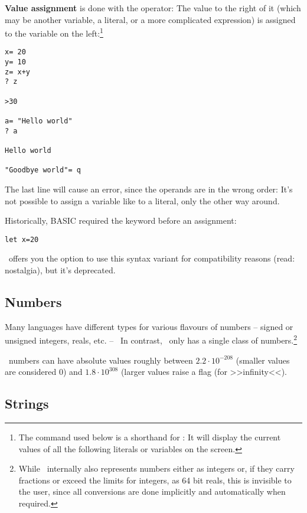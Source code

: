 \textbf{Value assignment} is done with the \Co{$=$} operator:  The value
to the right of it (which may be another variable, a literal, or a
more complicated expression) is assigned to the variable on the
left:\footnote{The command  used below is a shorthand for
: It will display the current values of all the following literals or
variables on the screen.}

\begin{lstlisting}
x= 20
y= 10
z= x+y
? z

>30

a= "Hello world"
? a

Hello world

"Goodbye world"= q
\end{lstlisting}

The last line will cause an error, since the operands are in the wrong
order: It's not possible to assign a variable like  to a literal,
only the other way around.

Historically, BASIC required the keyword  before an assignment:

\begin{lstlisting}
let x=20
\end{lstlisting}

\SB\ offers you the option to use this syntax variant for compatibility
reasons (read: nostalgia), but it's deprecated.

\subsection{Numbers}

Many languages have different types for various flavours of numbers --
signed or unsigned integers, reals, etc. --~ In contrast, \SB\ only has
a single class of numbers.\footnote{While \SB\ internally also
represents numbers either as integers or, if they carry fractions or
exceed the limits for integers, as 64 bit reals, this is invisible to
the user, since all conversions are done implicitly and automatically
when required.}

\SB\ numbers can have absolute values roughly between $2.2\cdot
10^{-208}$ (smaller values are considered $0$) and $1.8\cdot 10^{308}$
(larger values raise a flag  (for >>infinity<<).

\subsection{Strings}

